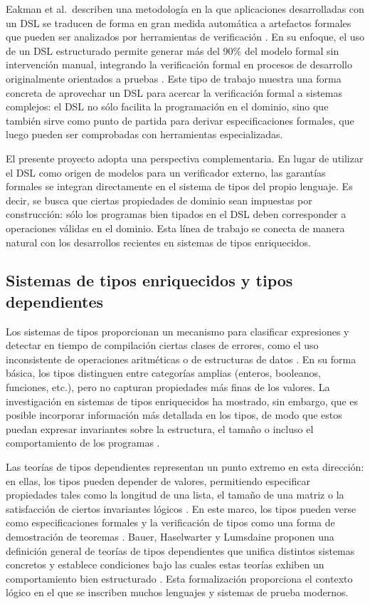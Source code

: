 \documentclass[conference]{IEEEtran}
\begin{document}
Eakman et al.\ describen una metodología en la que aplicaciones desarrolladas con un DSL se traducen de forma en gran medida automática a artefactos formales que pueden ser analizados por herramientas de verificación \cite{eakman2015}. En su enfoque, el uso de un DSL estructurado permite generar más del 90\% del modelo formal sin intervención manual, integrando la verificación formal en procesos de desarrollo originalmente orientados a pruebas \cite{eakman2015}. Este tipo de trabajo muestra una forma concreta de aprovechar un DSL para acercar la verificación formal a sistemas complejos: el DSL no sólo facilita la programación en el dominio, sino que también sirve como punto de partida para derivar especificaciones formales, que luego pueden ser comprobadas con herramientas especializadas.

El presente proyecto adopta una perspectiva complementaria. En lugar de utilizar el DSL como origen de modelos para un verificador externo, las garantías formales se integran directamente en el sistema de tipos del propio lenguaje. Es decir, se busca que ciertas propiedades de dominio sean impuestas por construcción: sólo los programas bien tipados en el DSL deben corresponder a operaciones válidas en el dominio. Esta línea de trabajo se conecta de manera natural con los desarrollos recientes en sistemas de tipos enriquecidos.

\subsection{Sistemas de tipos enriquecidos y tipos dependientes}

Los sistemas de tipos proporcionan un mecanismo para clasificar expresiones y detectar en tiempo de compilación ciertas clases de errores, como el uso inconsistente de operaciones aritméticas o de estructuras de datos \cite{cardelli1996}. En su forma básica, los tipos distinguen entre categorías amplias (enteros, booleanos, funciones, etc.), pero no capturan propiedades más finas de los valores. La investigación en sistemas de tipos enriquecidos ha mostrado, sin embargo, que es posible incorporar información más detallada en los tipos, de modo que estos puedan expresar invariantes sobre la estructura, el tamaño o incluso el comportamiento de los programas \cite{cardelli1996}.


Las teorías de tipos dependientes representan un punto extremo en esta dirección: en ellas, los tipos pueden depender de valores, permitiendo especificar propiedades tales como la longitud de una lista, el tamaño de una matriz o la satisfacción de ciertos invariantes lógicos \cite{bauer2020}. En este marco, los tipos pueden verse como especificaciones formales y la verificación de tipos como una forma de demostración de teoremas \cite{bauer2020,eisenberg2016}. Bauer, Haselwarter y Lumsdaine proponen una definición general de teorías de tipos dependientes que unifica distintos sistemas concretos y establece condiciones bajo las cuales estas teorías exhiben un comportamiento bien estructurado \cite{bauer2020}. Esta formalización proporciona el contexto lógico en el que se inscriben muchos lenguajes y sistemas de prueba modernos. 
\end{document}
